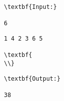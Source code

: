 \begin{verbatim}
\textbf{Input:}

6\end{verbatim}
\begin{verbatim}
1 4 2 3 6 5

\textbf{
\\}\end{verbatim}
\begin{verbatim}
\textbf{Output:}

38\end{verbatim}
